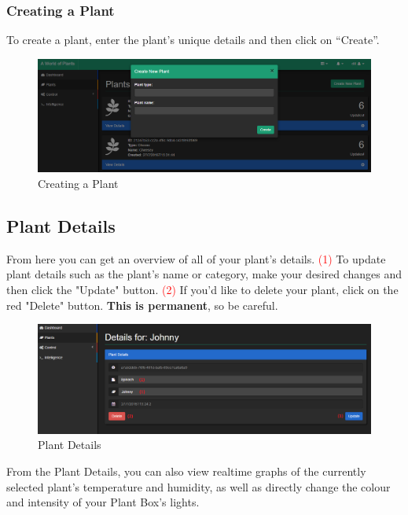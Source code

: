 \documentclass{article}
\begin{document}
		\subsubsection{Creating a Plant}
		\label{sec:creating-a-plant}
		To create a plant, enter the plant's unique details and then click on ``Create''.
		\begin{figure}[H]
			\includegraphics[width=\textwidth]{../images/UserManual/create-plant.PNG}
			\caption{Creating a Plant}
		\end{figure}
		
	\subsection{Plant Details}
	\label{sec:plant-details}
	From here you can get an overview of all of your plant's details.
	\newline
	\textcolor{red}{(1)} To update plant details such as the plant's name or category, make your desired changes and then click the "Update" button.
	\newline
	\textcolor{red}{(2)} If you'd like to delete your plant, click on the red "Delete" button. \textbf{This is permanent}, so be careful.
	\begin{figure}[H]
		\includegraphics[width=\textwidth]{../images/UserManual/plant-details.PNG}
		\caption{Plant Details}
	\end{figure}
	
	From the Plant Details, you can also view realtime graphs of the currently selected plant's temperature and humidity, as well as directly change the colour and intensity of your Plant Box's lights.
	
\end{document}
